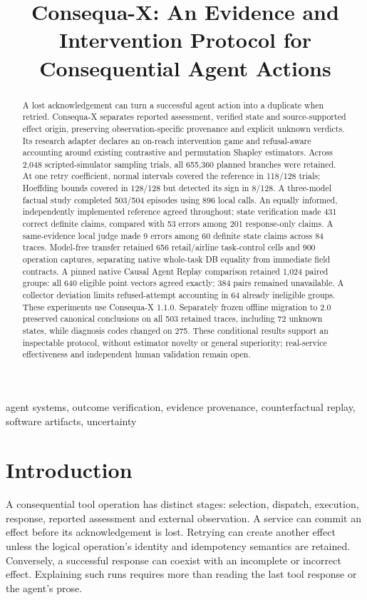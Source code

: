 \documentclass[conference]{IEEEtran}
\title{Consequa-X: An Evidence and Intervention Protocol for Consequential Agent Actions}
\author{\IEEEauthorblockN{Devrajsinh Jhala}\IEEEauthorblockA{Independent Researcher}}
\begin{document}
\raggedbottom
\maketitle

\begin{abstract}
A lost acknowledgement can turn a successful agent action into a duplicate
when retried. Consequa-X separates reported assessment, verified state and
source-supported effect origin, preserving observation-specific provenance
and explicit unknown verdicts. Its research adapter declares an on-reach
intervention game and refusal-aware accounting around existing contrastive
and permutation Shapley estimators. Across 2,048 scripted-simulator sampling
trials, all 655,360 planned branches were retained. At one retry coefficient,
normal intervals covered the reference in 118/128 trials; Hoeffding bounds
covered in 128/128 but detected its sign in 8/128. A three-model factual study
completed 503/504 episodes using 896 local calls. An equally informed,
independently implemented reference agreed throughout; state verification
made 431 correct definite claims, compared with 53 errors among 201
response-only claims. A same-evidence local judge made 9 errors among 60
definite state claims across 84 traces. Model-free transfer retained 656
retail/airline task-control cells and 900 operation captures, separating
native whole-task DB equality from immediate field contracts. A pinned native
Causal Agent Replay comparison retained 1,024 paired groups: all 640 eligible
point vectors agreed exactly; 384 pairs remained unavailable. A collector
deviation limits refused-attempt accounting in 64 already ineligible groups.
These experiments use Consequa-X 1.1.0. Separately frozen offline migration
to 2.0 preserved canonical conclusions on all 503 retained traces, including
72 unknown states, while diagnosis codes changed on 275. These conditional
results support an inspectable protocol, without estimator novelty or general
superiority; real-service effectiveness and independent human validation
remain open.
\end{abstract}

\begin{IEEEkeywords}
agent systems, outcome verification, evidence provenance, counterfactual replay,
software artifacts, uncertainty
\end{IEEEkeywords}

\section{Introduction}
A consequential tool operation has distinct stages: selection, dispatch,
execution, response, reported assessment and external observation. A service
can commit an effect before its acknowledgement is lost. Retrying can create
another effect unless the logical operation's identity and idempotency semantics
are retained. Conversely, a successful response can coexist with an incomplete
or incorrect effect. Explaining such runs requires more than reading the last
tool response or the agent's prose.
\end{document}
